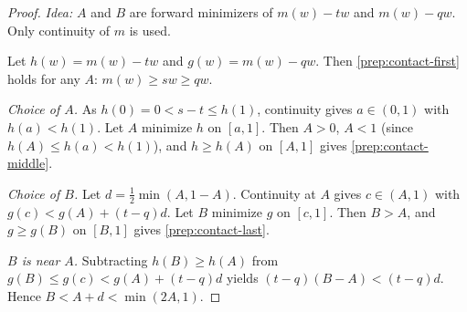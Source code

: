 \begin{proof}
\emph{Idea:} $A$ and $B$ are forward minimizers of $m(w)-tw$ and $m(w)-qw$. Only continuity of $m$ is used.

Let $h(w)=m(w)-tw$ and $g(w)=m(w)-qw$. Then \eqref{prep:contact-first} holds for any $A$: $m(w)\ge sw\ge qw$.

\emph{Choice of $A$.} As $h(0)=0<s-t\le h(1)$, continuity gives $a\in(0,1)$ with $h(a)<h(1)$. Let $A$ minimize $h$ on $[a,1]$. Then $A>0$, $A<1$ (since $h(A)\le h(a)<h(1)$), and $h\ge h(A)$ on $[A,1]$ gives \eqref{prep:contact-middle}.

\emph{Choice of $B$.} Let $d=\tfrac12\min(A,1-A)$. Continuity at $A$ gives $c\in(A,1)$ with $g(c)<g(A)+(t-q)d$. Let $B$ minimize $g$ on $[c,1]$. Then $B>A$, and $g\ge g(B)$ on $[B,1]$ gives \eqref{prep:contact-last}.

\emph{$B$ is near $A$.} Subtracting $h(B)\ge h(A)$ from $g(B)\le g(c)<g(A)+(t-q)d$ yields $(t-q)(B-A)<(t-q)d$. Hence $B<A+d<\min(2A,1)$.
\end{proof}
